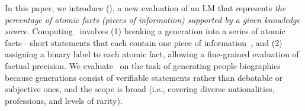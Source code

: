 In this paper, we introduce \textbf{\ours} (\ourslong), a new evaluation of an LM that represents {\em the percentage of atomic facts (pieces of information) supported by a given knowledge source}.
%
Computing \ours\ involves
(1) breaking a generation into a series of atomic facts---short statements that each contain one piece of information~\citep{nenkova2004evaluating,shapira-etal-2019-crowdsourcing,zhang-bansal-2021-finding,liu2022revisiting}, and (2) assigning a binary label %
to each atomic fact, allowing a fine-grained evaluation of factual precision.
%
We evaluate \ours\ on the task of generating people biographies because
generations
consist of verifiable statements rather than debatable or subjective ones,
and the scope is broad
(i.e., covering diverse nationalities, professions, and levels of rarity). %


